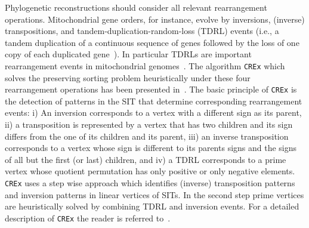 \documentclass{svmult}
\begin{document}
Phylogenetic reconstructions should consider all relevant rearrangement operations. 
Mitochondrial gene orders, for instance, evolve by inversions, (inverse)
transpositions, and tandem-duplication-random-loss (TDRL) events (i.e., a tandem
duplication of a continuous sequence of genes followed by the loss of one copy
of each duplicated gene~\cite{Chaudhuri_2006}).
In particular TDRLs are important rearrangement events in mitochondrial genomes~\cite{Boore_2000,Inoue_2003,San_2006}.
The algorithm \texttt{CREx} which solves the preserving sorting
problem heuristically under these four rearrangement operations has been
presented in~\cite{Bernt_2007b}.
The basic principle of \texttt{CREx} is the detection of patterns in the SIT that
determine corresponding rearrangement events: i) An inversion corresponds to a vertex with a different sign as its parent, 
ii) a transposition is represented by a vertex that has two children and its sign differs from the one of its children and its parent, 
iii) an inverse transposition corresponds to a vertex whose sign is different to its parents signs and the signs of all but the first 
(or last) children, and iv) a TDRL corresponds to a prime vertex whose quotient permutation has only positive or only negative elements. 
\texttt{CREx} uses a step wise approach which identifies (inverse) transposition patterns
and inversion patterns in linear vertices of SITs.
In the second step prime vertices are heuristically solved by combining TDRL and
inversion events.
For a detailed description of \texttt{CREx} the reader is referred to~\cite{Bernt_2009}.
\end{document}
